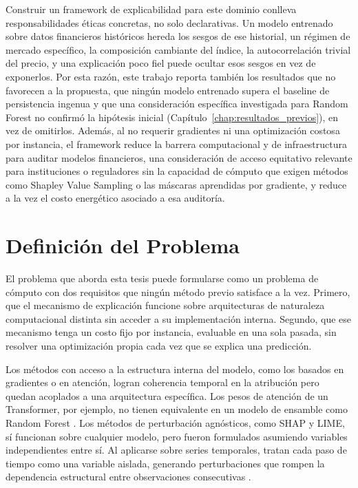 Construir un framework de explicabilidad para este dominio conlleva responsabilidades éticas concretas, no solo declarativas. Un modelo entrenado sobre datos financieros históricos hereda los sesgos de ese historial, un régimen de mercado específico, la composición cambiante del índice, la autocorrelación trivial del precio, y una explicación poco fiel puede ocultar esos sesgos en vez de exponerlos. Por esta razón, este trabajo reporta también los resultados que no favorecen a la propuesta, que ningún modelo entrenado supera el baseline de persistencia ingenua y que una consideración específica investigada para Random Forest no confirmó la hipótesis inicial (Capítulo~\ref{chap:resultados_previos}), en vez de omitirlos. Además, al no requerir gradientes ni una optimización costosa por instancia, el framework reduce la barrera computacional y de infraestructura para auditar modelos financieros, una consideración de acceso equitativo relevante para instituciones o reguladores sin la capacidad de cómputo que exigen métodos como Shapley Value Sampling o las máscaras aprendidas por gradiente, y reduce a la vez el costo energético asociado a esa auditoría.

\section{Definición del Problema}

El problema que aborda esta tesis puede formularse como un problema de cómputo con dos requisitos que ningún método previo satisface a la vez. Primero, que el mecanismo de explicación funcione sobre arquitecturas de naturaleza computacional distinta sin acceder a su implementación interna. Segundo, que ese mecanismo tenga un costo fijo por instancia, evaluable en una sola pasada, sin resolver una optimización propia cada vez que se explica una predicción.

Los métodos con acceso a la estructura interna del modelo, como los basados en gradientes o en atención, logran coherencia temporal en la atribución pero quedan acoplados a una arquitectura específica. Los pesos de atención de un Transformer, por ejemplo, no tienen equivalente en un modelo de ensamble como Random Forest \cite{arsenault2025}. Los métodos de perturbación agnósticos, como SHAP y LIME, sí funcionan sobre cualquier modelo, pero fueron formulados asumiendo variables independientes entre sí. Al aplicarse sobre series temporales, tratan cada paso de tiempo como una variable aislada, generando perturbaciones que rompen la dependencia estructural entre observaciones consecutivas \cite{tonekaboni2020, huang2025}.

